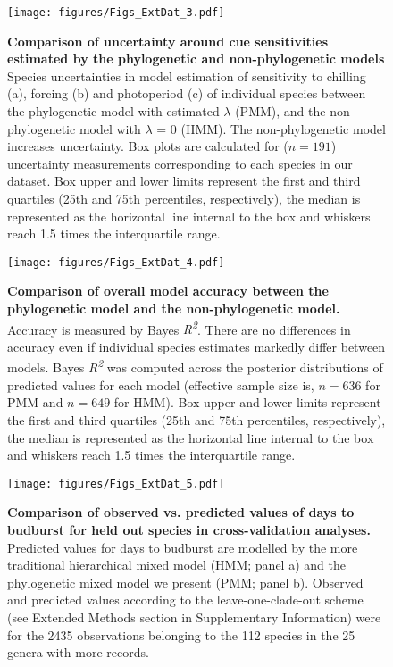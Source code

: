 \documentclass{article}
\begin{document}
\begin{figure}
  \centering
\noindent \texttt{[image: figures/Figs\_ExtDat\_3.pdf]}
  \caption{\textbf{Comparison of uncertainty around cue sensitivities estimated by the phylogenetic and non-phylogenetic models} Species uncertainties in model estimation of sensitivity to chilling (a), forcing (b) and photoperiod (c) of individual species between the phylogenetic model with estimated $\lambda$ (PMM), and the non-phylogenetic model with $\lambda$ = 0 (HMM). The non-phylogenetic model increases uncertainty. Box plots are calculated for ($n = 191$) uncertainty measurements corresponding to each species in our dataset. Box upper and lower limits represent the first and third quartiles (25th and 75th percentiles, respectively), the median is represented as the horizontal line internal to the box and whiskers reach 1.5 times the interquartile range.}
  \label{fig:suppuncertainties}
\end{figure}
\clearpage


\begin{figure}
  \centering
\noindent \texttt{[image: figures/Figs\_ExtDat\_4.pdf]}
  \caption{\textbf{Comparison of overall model accuracy between the phylogenetic model and the non-phylogenetic model.} Accuracy is measured by Bayes \emph{R\textsuperscript{2}}. There are no differences in accuracy even if individual species estimates markedly differ between models. Bayes \emph{R\textsuperscript{2}} was computed across the posterior distributions of predicted values for each model (effective sample size is, $n = 636$ for PMM and $n = 649$ for HMM). Box upper and lower limits represent the first and third quartiles (25th and 75th percentiles, respectively), the median is represented as the horizontal line internal to the box and whiskers reach 1.5 times the interquartile range.}
  \label{fig:accuracycomp}
\end{figure}
\clearpage

\begin{figure}
  \centering
\noindent \texttt{[image: figures/Figs\_ExtDat\_5.pdf]}
  \caption{\textbf{Comparison of observed vs. predicted values of days to budburst for held out species in cross-validation analyses.} Predicted values for days to budburst are modelled by the more traditional hierarchical mixed model (HMM; panel a) and the phylogenetic mixed model we present (PMM; panel b). Observed and predicted values according to the leave-one-clade-out scheme (see Extended Methods section in Supplementary Information) were for the 2435 observations belonging to the 112 species in the 25 genera with more records.}
  \label{fig:biasestimation}
\end{figure}
\clearpage
\end{document}
